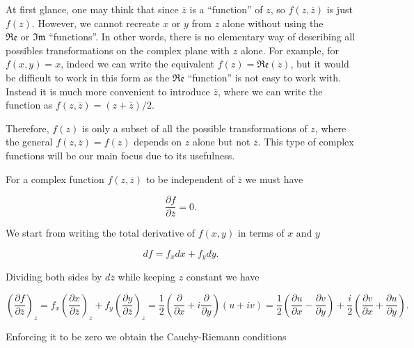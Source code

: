 \documentclass[english,a4paper,12pt]{report}
\begin{document}
At first glance, one may think that since \(\overline{z} \) is a ``function'' of \(z\), so \(f(z,\overline{z} )\) is just \(f(z)\). However, we cannot recreate \(x \text { or } y\) from \(z\) alone without using the \(\mathfrak{Re} \text { or } \mathfrak{Im}  \) ``functions''. In other words, there is no elementary way of describing all possibles transformations on the complex plane with \(z\) alone. For example, for \(f(x,y) = x\), indeed we can write the equivalent \(f(z) = \mathfrak{Re} (z) \), but it would be difficult to work in this form as the \(\mathfrak{Re} \) ``function'' is not easy to work with. Instead it is much more convenient to introduce \(\overline{z} \), where we can write the function as \(f(z,\overline{z} ) = (z + \overline{z} ) /2\). 

Therefore, \(f(z)\) is only a subset of all the possible transformations of \(z\), where the general \(f(z,\overline{z} ) = f(z)\) depends on \(z\) alone but not \(\overline{z} \). This type of complex functions will be our main focus due to its usefulness.

For a complex function \(f(z,\overline{z} )\) to be independent of \(\overline{z} \) we must have 

\begin{equation}
    \frac{\partial f}{\partial \overline{z} } = 0. 
\end{equation}

We start from writing the total derivative of \(f(x,y)\) in terms of \(x \text { and } y\)

\begin{equation}
    df = f_{x}  dx + f_{y}  dy.
\end{equation}

Dividing both sides by \(d \overline{z} \) while keeping \(z\) constant we have 

\begin{equation}
    \left( \frac{\partial f}{\partial \overline{z} } \right)_{z} = f_{x} \left( \frac{\partial x}{\partial \overline{z} } \right)_{z} + f_{y} \left( \frac{\partial y}{\partial \overline{z} } \right)_{z} = \frac{1}{2} \left( \frac{\partial }{\partial x} + i \frac{\partial }{\partial y}  \right) (u+iv) = \frac{1}{2} \left( \frac{\partial u}{\partial x} -\frac{\partial v}{\partial y}  \right) + \frac{i}{2} \left( \frac{\partial v}{\partial x} + \frac{\partial u}{\partial y}  \right).
\end{equation}

Enforcing it to be zero we obtain the Cauchy-Riemann conditions
\end{document}
